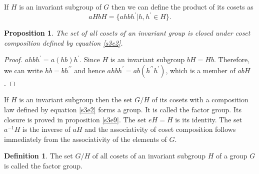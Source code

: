 \documentclass{article}
\theoremstyle{plain}
\numberwithin{thm}{section}
\theoremstyle{plain}
\newtheorem{prop}{Proposition}
\numberwithin{prop}{section}
\theoremstyle{definition}
\newtheorem{defn}{Definition}
\numberwithin{defn}{section}
\theoremstyle{remark}
\numberwithin{equation}{section}
\begin{document}
If $H$ is an invariant subgroup of $G$ then we can define the product of its
cosets as
\begin{equation}\label{s3e2}
aHbH  = \{ahbh^\prime | h, h^\prime \in H\}.
\end{equation}

\begin{prop}\label{s3e9}
The set of all cosets of an invariant group is closed under coset composition
defined by equation \eqref{s3e2}.
\end{prop}
\begin{proof}
$ahbh^\prime = a(hb)h^\prime$. Since $H$ is an invariant subgroup $bH = Hb$.
Therefore, we can write $hb = bh^{\prime\prime}$ and hence $ahbh^\prime = 
ab(h^{\prime\prime}h^\prime)$, which is a member of $abH$.
\end{proof}

If $H$ is an invariant subgroup then the set $G/H$ of its cosets with a 
composition law defined by equation \eqref{s3e2} forms a group. It is called
the factor group. Its closure is proved in proposition \eqref{s3e9}. The set
$eH = H$ is its identity. The set $a^{-1}H$ is the inverse of $aH$ and the
associativity of coset composition follows immediately from the associativity
of the elements of $G$.

\begin{defn}\label{s3d5}
The set $G/H$ of all cosets of an invariant subgroup $H$ of a group $G$ is
called the factor group.
\end{defn}
\end{document}
